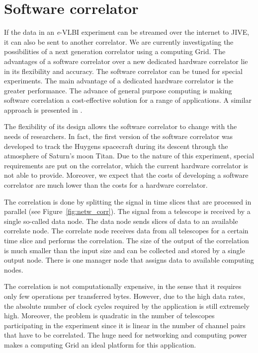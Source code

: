 \section{Software correlator}
If the data in an {\it e}-VLBI experiment can be streamed over the internet
to JIVE, it can also be sent to another correlator. We are currently
investigating the possibilities of a next generation correlator using
a computing Grid. The advantages of a software correlator over a new
dedicated hardware correlator lie in its flexibility and accuracy. The
software correlator can be tuned for special experiments. The main
advantage of a dedicated hardware correlator is the greater
performance. The advance of general purpose computing is making
software correlation a cost-effective solution for a range of
applications. A similar approach is presented in \cite{deller-2007}.

The flexibility of its design allows the software correlator to change
with the needs of researchers. In fact, the first version of the
software correlator was developed to track the Huygens spacecraft
during its descent through the atmosphere of Saturn's moon Titan. Due
to the nature of this experiment, special requirements are put
on the correlator, which the current hardware correlator is not able
to provide.  Moreover, we expect that the costs of developing a
software correlator are much lower than the costs for a hardware
correlator.

The correlation is done by splitting the signal in time slices that
are processed in parallel (see Figure~\ref{fig:netw_corr}). The signal
from a telescope is received by a single so-called data node.  The
data node sends slices of data to an available correlate node. The
correlate node receives data from all telescopes for a certain time
slice and performs the correlation. The size of the output of the
correlation is much smaller than the input size and can be collected
and stored by a single output node.  There is one manager node that
assigns data to available computing nodes.

The correlation is not computationally expensive, in the sense that it
requires only few operations per transferred bytes. However, due to
the high data rates, the absolute number of clock cycles required by
the application is still extremely high. Moreover, the problem is
quadratic in the number of telescopes participating in the experiment
since it is linear in the number of channel pairs that have to be
correlated. The huge need for networking and computing power makes a
computing Grid an ideal platform for this application.


